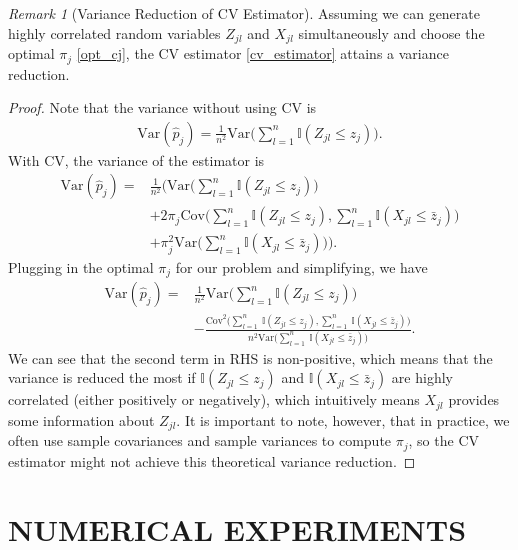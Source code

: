 \documentclass[preprint]{oscmjournal}
\theoremstyle{remark}
\newtheorem{remark}{Remark}
\begin{document}
\begin{remark}[Variance Reduction of CV Estimator]
Assuming we can generate highly correlated random variables $Z_{jl}$ and $X_{jl}$ simultaneously and choose the optimal $\pi_j$ \eqref{opt_cj}, the CV estimator \eqref{cv_estimator} attains a variance reduction. 
\end{remark}
\begin{proof}
Note that the variance without using CV is
\begin{align}
\text{Var}(\hat p_j) = \frac{1}{n^2}\text{Var}\bigg(\sum_{l=1}^n\mathbb I(Z_{jl}\leq z_j)\bigg).
\end{align}
With CV, the variance of the estimator is
\begin{align}
\text{Var}(\hat p_j) = &\frac{1}{n^2} \Bigg( \text{Var}\bigg(\sum_{l=1}^n\mathbb I(Z_{jl}\leq z_j)\bigg) \\
&+2\pi_j \text{Cov} \bigg(\sum_{l=1}^n\mathbb I(Z_{jl}\leq z_j),\sum_{l=1}^n\mathbb I(X_{jl}\leq \bar z_j) \bigg) \nonumber \\
&+\pi_j^2 \text{Var}\bigg(\sum_{l=1}^n\mathbb I(X_{jl}\leq \bar z_j)\bigg) \Bigg) \nonumber .
\end{align}
Plugging in the optimal $\pi_j$ for our problem and simplifying, we have
\begin{align}
\text{Var}(\hat p_j) =& \frac{1}{n^2}  \text{Var}\bigg(\sum_{l=1}^n\mathbb I(Z_{jl}\leq z_j)\bigg) \\
&- \frac{\text{Cov}^2\bigg(\sum_{l=1}^n\ \mathbb I(Z_{jl}\leq z_j), \sum_{l=1}^n\ \mathbb I(X_{jl}\leq \bar z_j) \bigg)}{n^2 \text{Var}\bigg(\sum_{l=1}^n\ \mathbb I(X_{jl}\leq \bar z_j)\bigg)}  \nonumber.
\end{align}
We can see that the second term in RHS is non-positive, which means that the variance is reduced the most if $\mathbb I(Z_{jl} \leq z_j)$ and $\mathbb I(X_{jl} \leq \bar z_j)$ are highly correlated (either positively or negatively), which intuitively means $X_{jl}$ provides some information about $Z_{jl}$. It is important to note, however, that in practice, we often use sample covariances and sample variances to compute $\pi_j$, so the CV estimator might not achieve this theoretical variance reduction. 
\end{proof}


\section{NUMERICAL EXPERIMENTS}
\label{sec:exp}
\end{document}
